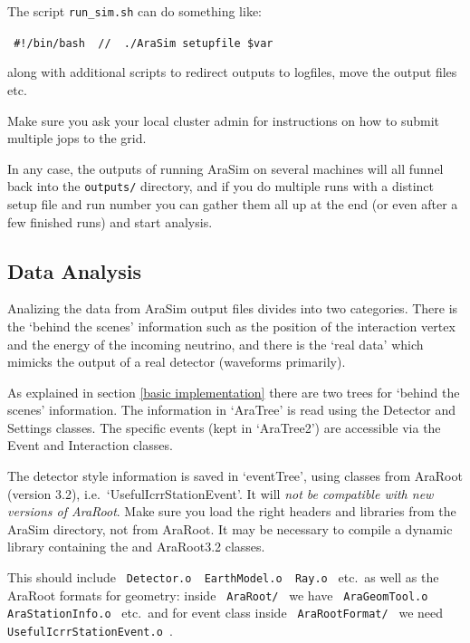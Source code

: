 \documentclass[a4paper,10pt]{article}
\newcommand{\room}{\vspace{0.3cm}}
\newcommand{\arasim}{AraSim\xspace}
\begin{document}
\room

The script \verb|run_sim.sh| can do something like:

\verb| #!/bin/bash  //  ./AraSim setupfile $var | 

along with additional scripts to redirect outputs to logfiles, move the output files etc. 


Make sure you ask your local cluster admin for instructions on how to submit multiple jops to the grid. 

\room

In any case, the outputs of running \arasim on several machines will all funnel back into the \verb|outputs/| directory, and if you do multiple runs with a distinct setup file and run number you can gather them all up at the end (or even after a few finished runs) and start analysis. 


\room

\subsection{Data Analysis}

Analizing the data from \arasim output files divides into two categories. There is the `behind the scenes' information such as the position of the interaction vertex and the energy of the incoming neutrino, and there is the `real data' which mimicks the output of a real detector (waveforms primarily). 

\room

As explained in section \ref{basic implementation} there are two trees for `behind the scenes' information. The information in `AraTree' is read using the Detector and Settings classes. The specific events (kept in `AraTree2') are accessible via the Event and Interaction classes. 

\room

The detector style information is saved in `eventTree', using classes from AraRoot (version 3.2), i.e.~`UsefulIcrrStationEvent'.  It will \emph{not be compatible with new versions of AraRoot}. Make sure you load the right headers and libraries from the \arasim directory, not from AraRoot. It may be necessary to compile a dynamic library containing the \arsim and AraRoot3.2 classes. 

This should include \verb| Detector.o  EarthModel.o  Ray.o | etc.~as well as the AraRoot formats for geometry: inside \verb| AraRoot/ | we have \verb| AraGeomTool.o  AraStationInfo.o | etc.~and for event class inside \verb| AraRootFormat/ | we need \verb| UsefulIcrrStationEvent.o |. \
\end{document}
